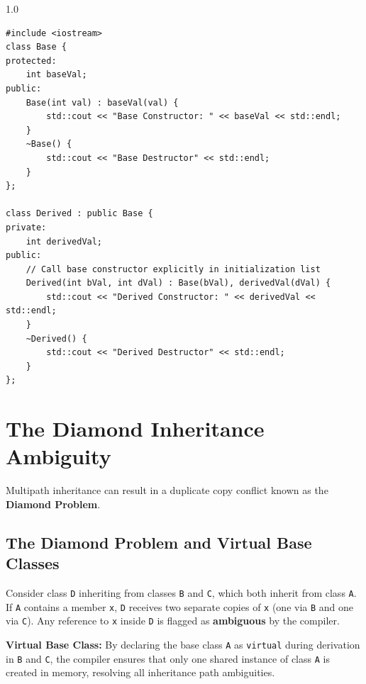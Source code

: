 \documentclass[12pt,a4paper]{article}
\begin{document}
\begin{tcolorbox}[examplebox, title={Code Example: Invocation of parameterized base constructors}]
\begin{spacing}{1.0}
\begin{verbatim}
#include <iostream>
class Base {
protected:
    int baseVal;
public:
    Base(int val) : baseVal(val) {
        std::cout << "Base Constructor: " << baseVal << std::endl;
    }
    ~Base() {
        std::cout << "Base Destructor" << std::endl;
    }
};

class Derived : public Base {
private:
    int derivedVal;
public:
    // Call base constructor explicitly in initialization list
    Derived(int bVal, int dVal) : Base(bVal), derivedVal(dVal) {
        std::cout << "Derived Constructor: " << derivedVal << std::endl;
    }
    ~Derived() {
        std::cout << "Derived Destructor" << std::endl;
    }
};
\end{verbatim}
\end{spacing}
\end{tcolorbox}

\section{The Diamond Inheritance Ambiguity}

Multipath inheritance can result in a duplicate copy conflict known as the \textbf{Diamond Problem}.

\subsection{The Diamond Problem and Virtual Base Classes}
Consider class \texttt{D} inheriting from classes \texttt{B} and \texttt{C}, which both inherit from class \texttt{A}.
If \texttt{A} contains a member \texttt{x}, \texttt{D} receives two separate copies of \texttt{x} (one via \texttt{B} and one via \texttt{C}). Any reference to \texttt{x} inside \texttt{D} is flagged as \textbf{ambiguous} by the compiler.
\begin{tcolorbox}[defbox]
\textbf{Virtual Base Class:} By declaring the base class \texttt{A} as \texttt{virtual} during derivation in \texttt{B} and \texttt{C}, the compiler ensures that only one shared instance of class \texttt{A} is created in memory, resolving all inheritance path ambiguities.
\end{tcolorbox}
\end{document}
